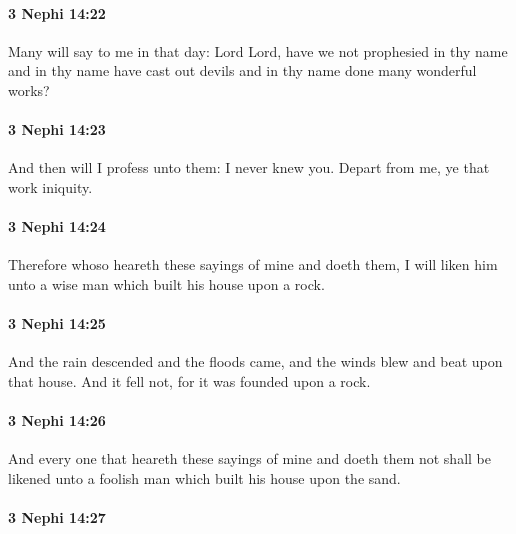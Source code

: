 		\paragraph{3 Nephi 14:22} %
			\label{3NEPHI-14-22}

			Many will say to me in that day:
			Lord Lord, have we not prophesied in thy name
			and in thy name have cast out devils
			and in thy name done many wonderful works?

		\paragraph{3 Nephi 14:23} %
			\label{3NEPHI-14-23}

			And then will I profess unto them:
			I never knew you.
			Depart from me, ye that work iniquity.

		\paragraph{3 Nephi 14:24} %
			\label{3NEPHI-14-24}

			Therefore whoso heareth these sayings of mine and doeth them,
			I will liken him unto a wise man which built his house upon a rock.

		\paragraph{3 Nephi 14:25} %
			\label{3NEPHI-14-25}

			And the rain descended and the floods came,
			and the winds blew and beat upon that house.
			And it fell not, for it was founded upon a rock.

		\paragraph{3 Nephi 14:26} %
			\label{3NEPHI-14-26}

			And every one that heareth these sayings of mine and doeth them not
			shall be likened unto a foolish man which built his house upon the sand.

		\paragraph{3 Nephi 14:27} %
			\label{3NEPHI-14-27}

